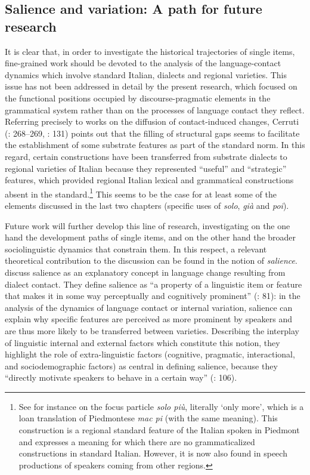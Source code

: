 \subsection{Salience and variation: A path for future research}
\hypertarget{Toc124860692}{}
It is clear that, in order to investigate the historical trajectories of single items, fine-grained work should be devoted to the analysis of the language-contact dynamics which involve standard Italian, dialects and regional varieties. This issue has not been addressed in detail by the present research, which focused on the functional positions occupied by discourse-pragmatic elements in the grammatical system rather than on the processes of language contact they reflect. Referring precisely to works on the diffusion of contact-induced changes, Cerruti (\citeyear{Cerruti2009}: 268--269, \citeyear{Cerruti2020}: 131) points out that the filling of structural gaps seems to facilitate the establishment of some substrate features as part of the standard norm. In this regard, certain constructions have been transferred from substrate dialects to regional varieties of Italian because they represented “useful” and “strategic” features, which provided regional Italian lexical and grammatical constructions absent in the standard.\footnote{See for instance \citet[89]{CerrutiRegis2014} on the focus particle \textit{solo più}, literally ‘only more’, which is a loan translation of Piedmontese \textit{mac pi} (with the same meaning). This construction is a regional standard feature of the Italian spoken in Piedmont and expresses a meaning for which there are no grammaticalized constructions in standard Italian. However, it is now also found in speech productions of speakers coming from other regions.} This seems to be the case for at least some of the elements discussed in the last two chapters (specific uses of \textit{solo}, \textit{già} and \textit{poi}).

Future work will further develop this line of research, investigating on the one hand the development paths of single items, and on the other hand the broader sociolinguistic dynamics that constrain them. In this respect, a relevant theoretical contribution to the discussion can be found in the notion of \textit{salience}. \citet{KerswillWilliams2002} discuss salience as an explanatory concept in language change resulting from dialect contact. They define salience as “a property of a linguistic item or feature that makes it in some way perceptually and cognitively prominent” (\citealt{KerswillWilliams2002}: 81): in the analysis of the dynamics of language contact or internal variation, salience can explain why specific features are perceived as more prominent by speakers and are thus more likely to be transferred between varieties. Describing the interplay of linguistic internal and external factors which constitute this notion, they highlight the role of extra-linguistic factors (cognitive, pragmatic, interactional, and sociodemographic factors) as central in defining salience, because they “directly motivate speakers to behave in a certain way” (\citealt{KerswillWilliams2002}: 106).

